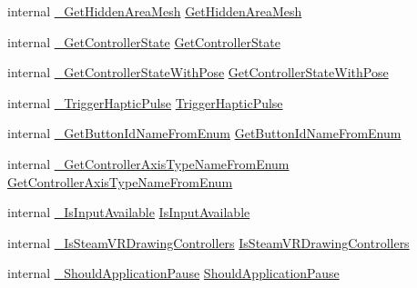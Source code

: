 \begin{DoxyCompactItemize}
\item 
internal \mbox{\hyperlink{struct_valve_1_1_v_r_1_1_i_v_r_system_a2778354bdfffa5063ed74f2634feb02d}{\+\_\+\+Get\+Hidden\+Area\+Mesh}} \mbox{\hyperlink{struct_valve_1_1_v_r_1_1_i_v_r_system_ad69e1074728820f7385004d571f2687a}{Get\+Hidden\+Area\+Mesh}}
\item 
internal \mbox{\hyperlink{struct_valve_1_1_v_r_1_1_i_v_r_system_a1eca77760e6464488c6ca3e083e0a456}{\+\_\+\+Get\+Controller\+State}} \mbox{\hyperlink{struct_valve_1_1_v_r_1_1_i_v_r_system_a820c4d678b9e885c8de11fc31aede166}{Get\+Controller\+State}}
\item 
internal \mbox{\hyperlink{struct_valve_1_1_v_r_1_1_i_v_r_system_ad69cca720213c448e77167bb46b1a804}{\+\_\+\+Get\+Controller\+State\+With\+Pose}} \mbox{\hyperlink{struct_valve_1_1_v_r_1_1_i_v_r_system_a95719e013581d2bc69b8ac13230f9926}{Get\+Controller\+State\+With\+Pose}}
\item 
internal \mbox{\hyperlink{struct_valve_1_1_v_r_1_1_i_v_r_system_a7d878e9f5dd86b552a79017e9b265b72}{\+\_\+\+Trigger\+Haptic\+Pulse}} \mbox{\hyperlink{struct_valve_1_1_v_r_1_1_i_v_r_system_a14c214fd36ef8b882166e9d1f03654c9}{Trigger\+Haptic\+Pulse}}
\item 
internal \mbox{\hyperlink{struct_valve_1_1_v_r_1_1_i_v_r_system_a0a9463bae6cfe3289f8b18e79db1dbb4}{\+\_\+\+Get\+Button\+Id\+Name\+From\+Enum}} \mbox{\hyperlink{struct_valve_1_1_v_r_1_1_i_v_r_system_a33d4426980f8543ddb97498cd31d712d}{Get\+Button\+Id\+Name\+From\+Enum}}
\item 
internal \mbox{\hyperlink{struct_valve_1_1_v_r_1_1_i_v_r_system_aa41d19dc0a8ab0539fef127d02dd471a}{\+\_\+\+Get\+Controller\+Axis\+Type\+Name\+From\+Enum}} \mbox{\hyperlink{struct_valve_1_1_v_r_1_1_i_v_r_system_a6b7a4e2865bc3a965e8d3aec231cb6d8}{Get\+Controller\+Axis\+Type\+Name\+From\+Enum}}
\item 
internal \mbox{\hyperlink{struct_valve_1_1_v_r_1_1_i_v_r_system_ae830dd893c1ac74196be24544e94f9ca}{\+\_\+\+Is\+Input\+Available}} \mbox{\hyperlink{struct_valve_1_1_v_r_1_1_i_v_r_system_a19022fa80da6a1237bd179eb97a98c10}{Is\+Input\+Available}}
\item 
internal \mbox{\hyperlink{struct_valve_1_1_v_r_1_1_i_v_r_system_a160c811798537299b253f20e8bcc1e4d}{\+\_\+\+Is\+Steam\+V\+R\+Drawing\+Controllers}} \mbox{\hyperlink{struct_valve_1_1_v_r_1_1_i_v_r_system_a9ca8e0aa72557ad6d53936ce945d638f}{Is\+Steam\+V\+R\+Drawing\+Controllers}}
\item 
internal \mbox{\hyperlink{struct_valve_1_1_v_r_1_1_i_v_r_system_ad63c0ab21538f30ce52420c007356f12}{\+\_\+\+Should\+Application\+Pause}} \mbox{\hyperlink{struct_valve_1_1_v_r_1_1_i_v_r_system_aa9fb2748a8d56a66f39629552db1fc66}{Should\+Application\+Pause}}

\end{DoxyCompactItemize}
